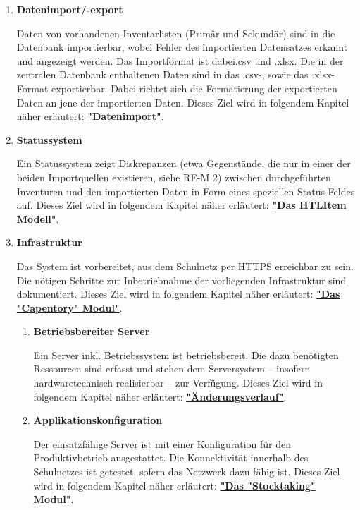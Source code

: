\documentclass[
    headings=optiontotocandhead,%
    twoside,
    numbers=noenddot,%
    toc=flat, %
    12pt, %
    titlepage, %
    parskip=full, %
    listof=totoc, %
    listof=flat, %
    numbers=noenddot, %
    bibliography=totoc, %
    a4paper,DIV=14,
    BCOR=15mm,
]{scrbook}
\begin{document}
\begin{enumerate}
    \item \textbf{Datenimport/-export}

    Daten von vorhandenen Inventarlisten (Primär und Sekundär) sind in die Datenbank importierbar, wobei Fehler des importierten Datensatzes erkannt und angezeigt werden. Das Importformat ist dabei.csv und .xlsx. 
    Die in der zentralen Datenbank enthaltenen Daten sind in das .csv-, sowie das .xlsx-Format exportierbar. Dabei richtet sich die Formatierung der exportierten Daten an jene der importierten Daten. 
    Dieses Ziel wird in folgendem Kapitel näher erläutert: \textbf{\href{datenimport}{"Datenimport"}}.


    \item \textbf{Statussystem}

    Ein Statussystem zeigt Diskrepanzen (etwa Gegenstände, die nur in einer der beiden Importquellen existieren, siehe RE-M 2) zwischen durchgeführten Inventuren und den importierten Daten in Form eines speziellen Status-Feldes auf. 
    Dieses Ziel wird in folgendem Kapitel näher erläutert: \textbf{\href{das-htlitem-modell}{"Das HTLItem Modell"}}.



    \item \textbf{Infrastruktur}

    Das System ist vorbereitet, aus dem Schulnetz per HTTPS erreichbar zu sein. Die nötigen Schritte zur Inbetriebnahme der vorliegenden Infrastruktur sind dokumentiert. 
    Dieses Ziel wird in folgendem Kapitel näher erläutert: \textbf{\href{das-capentory-modul}{"Das "Capentory" Modul"}}.
    
    \begin{enumerate}
      \item	\textbf{Betriebsbereiter Server}

      Ein Server inkl. Betriebssystem ist betriebsbereit. Die dazu benötigten Ressourcen sind erfasst und stehen dem Serversystem – insofern hardwaretechnisch realisierbar – zur Verfügung.
      Dieses Ziel wird in folgendem Kapitel näher erläutert: \textbf{\href{uxe4nderungsverlauf}{"Änderungsverlauf"}}.
    
      \item	\textbf{Applikationskonfiguration}

      Der einsatzfähige Server ist mit einer Konfiguration für den Produktivbetrieb ausgestattet. Die Konnektivität innerhalb des Schulnetzes ist getestet, sofern das Netzwerk dazu fähig ist.
      Dieses Ziel wird in folgendem Kapitel näher erläutert: \textbf{\href{das-stocktaking-modul}{"Das "Stocktaking" Modul"}}.
      

\end{enumerate}
\end{enumerate}
\end{document}

